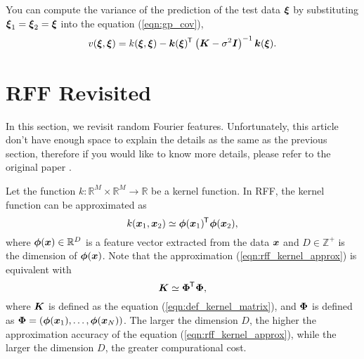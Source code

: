 \documentclass[twocolumn,a4paper,10pt]{article}
\begin{document}
You can compute the variance of the prediction of the test data $\boldsymbol{\xi}$
by substituting $\boldsymbol{\xi}_1 = \boldsymbol{\xi}_2 = \boldsymbol{\xi}$ into the equation (\ref{eqn:gp_cov}),
\begin{equation}
    v (\boldsymbol{\xi}, \boldsymbol{\xi}) = k (\boldsymbol{\xi}, \boldsymbol{\xi})
    - \boldsymbol{k} (\boldsymbol{\xi})^{\mkern-1.5mu\mathsf{T}}\hspace{0.5pt} \left( \boldsymbol{K} - \sigma^2 \boldsymbol{I} \right)^{-1} \boldsymbol{k} (\boldsymbol{\xi}).
\end{equation}


\section{RFF Revisited}\titlebar

In this section, we revisit random Fourier features. Unfortunately, this article don't have
enough space to explain the details as the same as the previous section, therefore if you
would like to know more details, please refer to the original paper \cite{Rahimi2007}.

Let the function $k: \mathbb{R}^M \times \mathbb{R}^M \to \mathbb{R}$ be a kernel function.
In RFF, the kernel function can be approximated as
\begin{equation}
    k (\boldsymbol{x}_1, \boldsymbol{x}_2) \simeq \boldsymbol{\phi}(\boldsymbol{x}_1)^{\mkern-1.5mu\mathsf{T}}\hspace{0.5pt} \boldsymbol{\phi}(\boldsymbol{x}_2),
    \label{eqn:rff_kernel_approx}
\end{equation}
where $\boldsymbol{\phi}(\boldsymbol{x}) \in \mathbb{R}^D$ is a feature vector extracted from 
the data $\boldsymbol{x}$ and $D \in \mathbb{Z}^+$ is the dimension of $\boldsymbol{\phi}(\boldsymbol{x})$.
Note that the approximation (\ref{eqn:rff_kernel_approx}) is equivalent with
\begin{equation}
    \boldsymbol{K} \simeq \boldsymbol{\Phi}^{\mkern-1.5mu\mathsf{T}}\hspace{0.5pt} \boldsymbol{\Phi},
    \label{eqn:rff_kernel_approx_matrix}
\end{equation}
where $\boldsymbol{K}$ is defined as the equation (\ref{eqn:def_kernel_matrix}), and $\boldsymbol{\Phi}$ is defined
as $\boldsymbol{\Phi} = (\boldsymbol{\phi} (\boldsymbol{x}_1), \ldots, \boldsymbol{\phi} (\boldsymbol{x}_N))$.
The larger the dimension $D$, the higher the approximation accuracy of the equation
(\ref{eqn:rff_kernel_approx}), while the larger the dimension $D$, the greater compurational cost.
\end{document}
